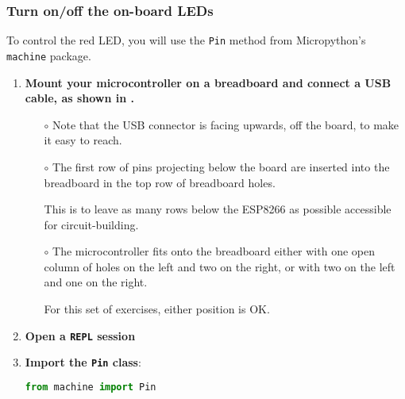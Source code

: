 \subsubsection{\howto Turn on/off the on-board LEDs}
To control the red LED, you will use the \lstinline{Pin} method from Micropython’s \lstinline{machine} package.
\begin{enumerate}
	\item \textbf{Mount your microcontroller on a breadboard and connect a USB cable, as shown in .} 
	
	\begin{itemize}
		\item[$\circ$] Note that the USB connector is facing upwards, off the board, to make it easy to reach. 
		\item[$\circ$] The first row of pins projecting below the board are inserted into the breadboard in the top row of breadboard holes. 
		
		This is to leave as many rows below the ESP8266 as possible accessible for circuit-building. 
	
		\item[$\circ$] The microcontroller fits onto the breadboard either with one open column of holes on the left and two on the right, or with two on the left and one on the right. 
		
		\smallskip
		For this set of exercises, either position is OK.
	\end{itemize} 

	\item \textbf{Open a \texttt{REPL} session}
	
	\item \textbf{Import the \texttt{Pin} class}:%
\begin{lstlisting}[language=Python]
from machine import Pin 
\end{lstlisting}	


\end{enumerate}

